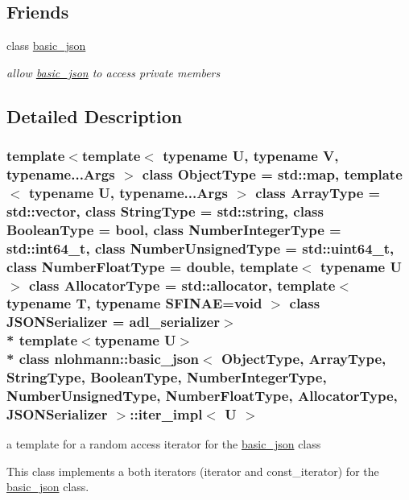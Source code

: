 \subsection*{Friends}
\begin{DoxyCompactItemize}
\item 
class \hyperlink{classnlohmann_1_1basic__json_1_1iter__impl_ada3100cdb8700566051828f1355fa745}{basic\+\_\+json}\hypertarget{classnlohmann_1_1basic__json_1_1iter__impl_ada3100cdb8700566051828f1355fa745}{}\label{classnlohmann_1_1basic__json_1_1iter__impl_ada3100cdb8700566051828f1355fa745}

\begin{DoxyCompactList}\small\item\em allow \hyperlink{classnlohmann_1_1basic__json}{basic\+\_\+json} to access private members \end{DoxyCompactList}\end{DoxyCompactItemize}


\subsection{Detailed Description}
\subsubsection*{template$<$template$<$ typename U, typename V, typename...\+Args $>$ class Object\+Type = std\+::map, template$<$ typename U, typename...\+Args $>$ class Array\+Type = std\+::vector, class String\+Type = std\+::string, class Boolean\+Type = bool, class Number\+Integer\+Type = std\+::int64\+\_\+t, class Number\+Unsigned\+Type = std\+::uint64\+\_\+t, class Number\+Float\+Type = double, template$<$ typename U $>$ class Allocator\+Type = std\+::allocator, template$<$ typename T, typename S\+F\+I\+N\+A\+E=void $>$ class J\+S\+O\+N\+Serializer = adl\+\_\+serializer$>$\\*
template$<$typename U$>$\\*
class nlohmann\+::basic\+\_\+json$<$ Object\+Type, Array\+Type, String\+Type, Boolean\+Type, Number\+Integer\+Type, Number\+Unsigned\+Type, Number\+Float\+Type, Allocator\+Type, J\+S\+O\+N\+Serializer $>$\+::iter\+\_\+impl$<$ U $>$}

a template for a random access iterator for the \hyperlink{classnlohmann_1_1basic__json}{basic\+\_\+json} class 

This class implements a both iterators (iterator and const\+\_\+iterator) for the \hyperlink{classnlohmann_1_1basic__json}{basic\+\_\+json} class.

